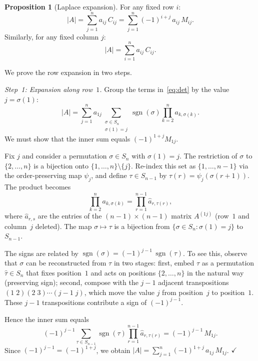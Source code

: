 \documentclass[12pt,a4paper]{article}
\makeatletter
\theoremstyle{definition}
\newtheorem{proposition}{Proposition}
\renewenvironment{proof}[1][\proofname]{\par
  \pushQED{\qed}%
  \normalfont \topsep6\p@\@plus6\p@\relax
  \trivlist
  \item[\hskip\labelsep\bfseries #1\@addpunct{.}]\ignorespaces
}{%
  \popQED\endtrivlist\@endpefalse
}
\makeatother
\begin{document}
\begin{proposition}[Laplace expansion]\label{prp:laplace}
For any fixed row $i$:
\begin{equation}\label{eq:laplace_row}
|A| = \sum_{j=1}^{n} a_{ij}\, C_{ij} = \sum_{j=1}^{n} (-1)^{i+j}\, a_{ij}\, M_{ij}.
\end{equation}
Similarly, for any fixed column $j$:
\begin{equation}\label{eq:laplace_col}
|A| = \sum_{i=1}^{n} a_{ij}\, C_{ij}.
\end{equation}
\end{proposition}

\begin{proof}
We prove the row expansion in two steps.

\emph{Step~1: Expansion along row~$1$.}
Group the terms in~\eqref{eq:det} by the value $j = \sigma(1)$:
\[
|A| = \sum_{j=1}^{n} a_{1j} \sum_{\substack{\sigma \in S_n \\ \sigma(1)=j}} \operatorname{sgn}(\sigma) \prod_{k=2}^{n} a_{k,\sigma(k)}.
\]
We must show that the inner sum equals $(-1)^{1+j} M_{1j}$.

Fix $j$ and consider a permutation $\sigma \in S_n$ with $\sigma(1) = j$. The restriction of $\sigma$ to $\{2, \dots, n\}$ is a bijection onto $\{1, \dots, n\} \setminus \{j\}$. Re-index this set as $\{1, \dots, n-1\}$ via the order-preserving map $\psi_j$, and define $\tau \in S_{n-1}$ by $\tau(r) = \psi_j(\sigma(r+1))$. The product becomes
\[
\prod_{k=2}^{n} a_{k,\sigma(k)} = \prod_{r=1}^{n-1} \hat{a}_{r,\tau(r)},
\]
where $\hat{a}_{r,s}$ are the entries of the $(n-1) \times (n-1)$ matrix $A^{(1j)}$ (row~$1$ and column~$j$ deleted). The map $\sigma \mapsto \tau$ is a bijection from $\{\sigma \in S_n : \sigma(1) = j\}$ to $S_{n-1}$.

The signs are related by $\operatorname{sgn}(\sigma) = (-1)^{j-1}\, \operatorname{sgn}(\tau)$. To see this, observe that $\sigma$ can be reconstructed from $\tau$ in two stages: first, embed $\tau$ as a permutation $\hat{\tau} \in S_n$ that fixes position~$1$ and acts on positions $\{2, \dots, n\}$ in the natural way (preserving sign); second, compose with the $j-1$ adjacent transpositions $(1\;2)(2\;3)\cdots(j{-}1\;j)$, which move the value $j$ from position~$j$ to position~$1$. These $j - 1$ transpositions contribute a sign of $(-1)^{j-1}$.

Hence the inner sum equals
\[
(-1)^{j-1} \sum_{\tau \in S_{n-1}} \operatorname{sgn}(\tau) \prod_{r=1}^{n-1} \hat{a}_{r,\tau(r)} = (-1)^{j-1}\, M_{1j}.
\]
Since $(-1)^{j-1} = (-1)^{1+j}$, we obtain $|A| = \sum_{j=1}^{n} (-1)^{1+j}\, a_{1j}\, M_{1j}$. $\checkmark$


\end{proof}
\end{document}
